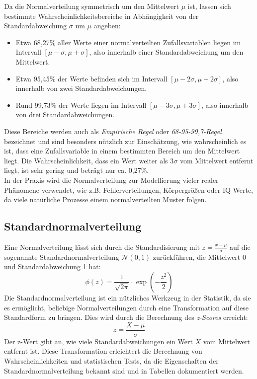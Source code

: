 Da die Normalverteilung symmetrisch um den Mittelwert $\mu$ ist, lassen sich bestimmte Wahrscheinlichkeitsbereiche in Abhängigkeit von der Standardabweichung $\sigma$ um $\mu$ angeben:

\begin{itemize}
    \item Etwa 68,27\% aller Werte einer normalverteilten Zufallsvariablen liegen im Intervall $[\mu - \sigma, \mu + \sigma]$, also innerhalb einer Standardabweichung um den Mittelwert.
    \item Etwa 95,45\% der Werte befinden sich im Intervall $[\mu - 2\sigma, \mu + 2\sigma]$, also innerhalb von zwei Standardabweichungen.
    \item Rund 99,73\% der Werte liegen im Intervall $[\mu - 3\sigma, \mu + 3\sigma]$, also innerhalb von drei Standardabweichungen.
\end{itemize}
Diese Bereiche werden auch als \textit{Empirische Regel} oder \textit{68-95-99,7-Regel} bezeichnet und sind besonders nützlich zur Einschätzung, wie wahrscheinlich es ist, dass eine Zufallsvariable in einem bestimmten Bereich um den Mittelwert liegt. Die Wahrscheinlichkeit, dass ein Wert weiter als $3\sigma$ vom Mittelwert entfernt liegt, ist sehr gering und beträgt nur ca. 0,27\%. \\
In der Praxis wird die Normalverteilung zur Modellierung vieler realer Phänomene verwendet, wie z.B. Fehlerverteilungen, Körpergrößen oder IQ-Werte, da viele natürliche
Prozesse einem normalverteilten Muster folgen. \cite{skript_statistik}


\subsection{Standardnormalverteilung}
\label{sec:standard_normal_distribution}

Eine Normalverteilung lässt sich durch die Standardisierung mit $z = \frac{x - \mu}{\sigma}$ auf die sogenannte Standardnormalverteilung $\mathcal{N}(0, 1)$ zurückführen, die Mittelwert 0 und Standardabweichung 1 hat:
\[
\phi(z) = \frac{1}{\sqrt{2 \pi}} \cdot \exp\left(-\frac{z^2}{2}\right)
\]
Die Standardnormalverteilung ist ein nützliches Werkzeug in der Statistik, da sie es ermöglicht, beliebige Normalverteilungen durch eine Transformation auf diese Standardform zu bringen. Dies wird durch die Berechnung des \textit{z-Scores} erreicht:
\[
z = \frac{X - \mu}{\sigma}
\]
Der z-Wert gibt an, wie viele Standardabweichungen ein Wert \(X\) vom Mittelwert entfernt ist. Diese Transformation erleichtert die Berechnung von Wahrscheinlichkeiten und statistischen Tests, da die Eigenschaften der Standardnormalverteilung bekannt sind und in Tabellen dokumentiert werden.


